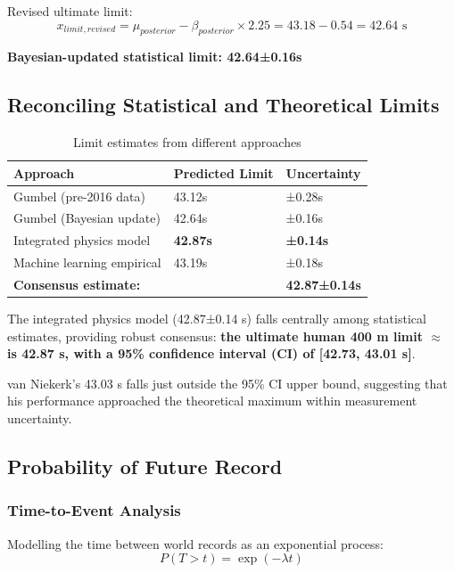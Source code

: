 Revised ultimate limit:
\begin{equation}
x_{limit,revised} = \mu_{posterior} - \beta_{posterior} \times 2.25 = 43.18 - 0.54 = 42.64 \text{ s}
\end{equation}

\textbf{Bayesian-updated statistical limit: 42.64±0.16s}

\subsection{Reconciling Statistical and Theoretical Limits}

\begin{table}[H]
\centering
\caption{Limit estimates from different approaches}
\begin{tabular}{@{}lll@{}}
\toprule
\textbf{Approach} & \textbf{Predicted Limit} & \textbf{Uncertainty} \\
\midrule
Gumbel (pre-2016 data) & 43.12s & ±0.28s \\
Gumbel (Bayesian update) & 42.64s & ±0.16s \\
Integrated physics model & \textbf{42.87s} & \textbf{±0.14s} \\
Machine learning empirical & 43.19s & ±0.18s \\
\bottomrule
\multicolumn{2}{l}{\textbf{Consensus estimate:}} & \textbf{42.87±0.14s} \\
\bottomrule
\end{tabular}
\end{table}

The integrated physics model (42.87±0.14 s) falls centrally among statistical estimates, providing robust consensus: \textbf{the ultimate human 400 m limit $\approx$ is 42.87 s, with a 95\% confidence interval (CI) of [42.73, 43.01 s]}.

van Niekerk's 43.03 s falls just outside the 95\% CI upper bound, suggesting that his performance approached the theoretical maximum within measurement uncertainty.

\subsection{Probability of Future Record}

\subsubsection{Time-to-Event Analysis}

Modelling the time between world records as an exponential process:
\begin{equation}
P(T > t) = \exp(-\lambda t)
\end{equation}

